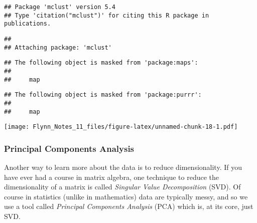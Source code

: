 \documentclass[]{article}
\newenvironment{Shaded}{\begin{snugshade}}{\end{snugshade}}
\newcommand{\KeywordTok}[1]{\textcolor[rgb]{0.13,0.29,0.53}{\textbf{#1}}}
\newcommand{\DataTypeTok}[1]{\textcolor[rgb]{0.13,0.29,0.53}{#1}}
\newcommand{\DecValTok}[1]{\textcolor[rgb]{0.00,0.00,0.81}{#1}}
\newcommand{\FloatTok}[1]{\textcolor[rgb]{0.00,0.00,0.81}{#1}}
\newcommand{\StringTok}[1]{\textcolor[rgb]{0.31,0.60,0.02}{#1}}
\newcommand{\OperatorTok}[1]{\textcolor[rgb]{0.81,0.36,0.00}{\textbf{#1}}}
\newcommand{\NormalTok}[1]{#1}
\begin{document}
\begin{verbatim}
## Package 'mclust' version 5.4
## Type 'citation("mclust")' for citing this R package in publications.
\end{verbatim}

\begin{verbatim}
## 
## Attaching package: 'mclust'
\end{verbatim}

\begin{verbatim}
## The following object is masked from 'package:maps':
## 
##     map
\end{verbatim}

\begin{verbatim}
## The following object is masked from 'package:purrr':
## 
##     map
\end{verbatim}

\begin{Shaded}
\end{Shaded}

\texttt{[image: Flynn\_Notes\_11\_files/figure-latex/unnamed-chunk-18-1.pdf]}

\subsubsection{Principal Components
Analysis}\label{principal-components-analysis}

Another way to learn more about the data is to reduce dimensionality. If
you have ever had a course in matrix algebra, one technique to reduce
the dimensionality of a matrix is called \emph{Singular Value
Decomposition} (SVD). Of course in statistics (unlike in mathematics)
data are typically messy, and so we use a tool called \emph{Principal
Components Analysis} (PCA) which is, at its core, just SVD.
\end{document}
